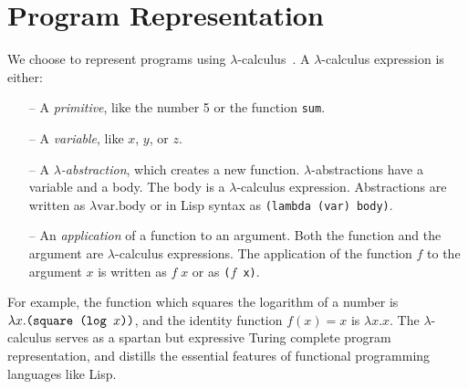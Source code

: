 \documentclass{article}
\begin{document}
\section{Program Representation}\label{programrepresentation}
We choose to represent programs using $\lambda$-calculus~\cite{pierce}.
A $\lambda$-calculus expression is either:
\begin{itemize}
  \item[--] A \emph{primitive}, like the number 5 or the function \texttt{sum}.
  \item[--] A \emph{variable}, like $x$, $y$, or $z$.
  \item[--] A $\lambda$\emph{-abstraction}, which creates a new function.  $\lambda$-abstractions have a variable and a body. The body is a $\lambda$-calculus expression. Abstractions are written as $\lambda \text{var}. \text{body}$ or in Lisp syntax as \mbox{\texttt{(lambda (\textrm{var}) \textrm{body})}}.
  \item[--] An \emph{application} of a function to an argument. Both the function and the argument are $\lambda$-calculus expressions. The application of the function $f$ to the argument $x$ is written as $f\; x$ or as \texttt{($f$ x)}.
\end{itemize}

For example, the function which squares the logarithm of a number is
$\lambda x.\text{\tt(square (log $x$))}$, and the identity function $f(x) = x$ is $\lambda x.x$. The
$\lambda$-calculus serves as a spartan but expressive Turing complete
program representation, and distills the essential features of functional
programming languages like Lisp.
\end{document}
